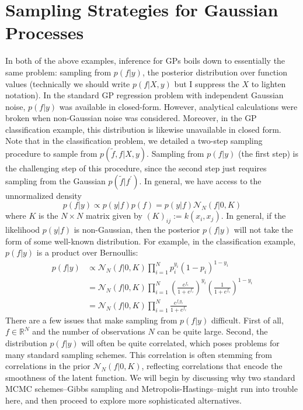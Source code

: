 \documentclass[12pt]{article}
\newcommand{\R}{\mathcal{R}}
\def\R{\mathbb{R}}
\begin{document}
\section{Sampling Strategies for Gaussian Processes}
In both of the above examples, inference for GPs boils down to essentially the same problem: sampling from $p(f|y)$, the posterior distribution over function values
(technically we should write $p(f|X, y)$ but I suppress the $X$ to lighten notation). In the standard GP regression problem with independent Gaussian noise, $p(f|y)$
was available in closed-form. However, analytical calculations were broken when non-Gaussian noise was considered. Moreover, in the GP classification example, this 
distribution is likewise unavailable in closed form. Note that in the classification problem, we detailed a two-step sampling procedure to sample from 
$p(\tilde{f}, f|X, y)$. Sampling from $p(f|y)$ (the first step) is the challenging step of this procedure, since the second step just requires sampling from the Gaussian 
$p(\tilde{f}|f^\prime)$. In general, we have access to the unnormalized density
\[p(f|y) \propto p(y|f)p(f) = p(y|f)\mathcal{N}_N(f|0, K)\]
where $K$ is the $N \times N$ matrix given by $(K)_{ij} := k(x_i, x_j)$. In general, if the likelihood $p(y|f)$ is non-Gaussian, then the posterior $p(f|y)$ will not take the 
form of some well-known distribution. For example, in the classification example, $p(f|y)$ is a product over Bernoullis:
\begin{align}
p(f|y) &\propto \mathcal{N}_N(f|0, K) \prod_{i = 1}^{N} p_i^{y_i}(1 - p_i)^{1 - y_i} \label{logistic_post} \\
	 &= \mathcal{N}_N(f|0, K) \prod_{i = 1}^{N} \left(\frac{e^{f_i}}{1 + e^{f_i}}\right)^{y_i}\left(\frac{1}{1 + e^{f_i}}\right)^{1 - y_i} \nonumber \\
	 &= \mathcal{N}_N(f|0, K) \prod_{i = 1}^{N} \frac{e^{f_i y_i}}{1 + e^{f_i}} \nonumber
\end{align}
There are a few issues that make sampling from $p(f|y)$ difficult. First of all, $f \in \R^N$ and the number of observations $N$ can be quite large. Second, the distribution 
$p(f|y)$ will often be quite correlated, which poses problems for many standard sampling schemes. This correlation is often stemming from correlations in the prior
$\mathcal{N}_N(f|0, K)$, reflecting correlations that encode the smoothness of the latent function. We will begin by discussing why two standard MCMC schemes--Gibbs sampling
and Metropolis-Hastings--might run into trouble here, and then proceed to explore more sophisticated alternatives.  
\end{document}
